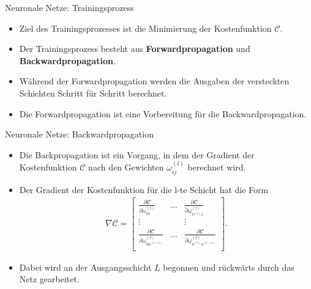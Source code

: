 \begin{frame}{Neuronale Netze: Trainingsprozess}
    \begin{itemize}
        \item<1-> Ziel des Trainingsprozesses ist die Minimierung der Kostenfunktion $\mathcal{C}$.
        \item<2-> Der Trainingsprozess besteht aus \textbf{Forwardpropagation} und
        \textbf{Backwardpropagation}.
        \item<3-> Während der Forwardpropagation werden die Ausgaben der versteckten Schichten Schritt für Schritt berechnet.
        \item<4-> Die Forwardpropagation ist eine Vorbereitung für die Backwardpropagation.
    \end{itemize}
\end{frame}

\begin{frame}{Neuronale Netze: Backwardpropagation}
    \begin{itemize}
        \item<1-> Die Backpropagation ist ein Vorgang, in dem der Gradient der Kostenfunktion $\mathcal{C}$ nach den
        Gewichten $\omega_{ij}^{(l)}$ berechnet wird.
        \item<2-> Der Gradient der Kostenfunktion für die l-te Schicht hat die Form
        \begin{align*}
            \nabla\mathcal{C}=
            \begin{bmatrix}
                \frac{\partial \mathcal{C}}{\partial \omega_{01}^{(l)}} & \dots &
                \frac{\partial \mathcal{C}}{\partial \omega_{n^{(l)}1}^{(l)}} \\
                \vdots & & \vdots \\
                \frac{\partial \mathcal{C}}{\partial \omega_{0n^{(l-1)}}^{(l)}} & \dots &
                \frac{\partial \mathcal{C}}{\partial \omega_{n^{(l)}n^{(l-1)}}^{(l)}} \\
            \end{bmatrix}.
        \end{align*}
        \item<3-> Dabei wird an der Ausgangsschicht $L$ begonnen und rückwärts durch das Netz gearbeitet.
    \end{itemize}
\end{frame}

